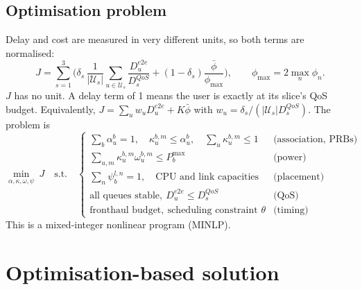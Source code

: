 \documentclass[11pt,oneside]{report}
\newcommand{\cU}{\mathcal{U}}
\begin{document}
\subsection{Optimisation problem}
Delay and cost are measured in very different units, so both terms are normalised:
\begin{equation}\label{eq:J}
	J=\sum_{s=1}^{3}\Big(\delta_s\,\frac{1}{|\cU_s|}\sum_{u\in\cU_s}\frac{D_u^{e2e}}{D_s^{QoS}}+(1-\delta_s)\frac{\bar\phi}{\phi_{\max}}\Big),\qquad \phi_{\max}=2\max_n\phi_n .
\end{equation}
$J$ has no unit. A delay term of 1 means the user is exactly at its slice's QoS budget.
Equivalently, $J=\sum_u w_uD_u^{e2e}+K\bar\phi$ with $w_u=\delta_s/(|\cU_s|D_s^{QoS})$.
The problem is
\begin{equation}\label{eq:problem}
	\min_{\alpha,\kappa,\omega,\psi}\ J
	\quad\text{s.t.}\quad
	\begin{cases}
		\sum_b\alpha_u^b=1, \quad \kappa_u^{b,m}\le\alpha_u^b, \quad \sum_u\kappa_u^{b,m}\le1 & \text{(association, PRBs)}\\
		\sum_{u,m}\kappa_u^{b,m}\omega_u^{b,m}\le P_b^{\max} & \text{(power)}\\
		\sum_n\psi_b^{l,n}=1,\quad \text{CPU and link capacities} & \text{(placement)}\\
		\text{all queues stable},\ D_u^{e2e}\le D_s^{QoS} & \text{(QoS)}\\
		\text{fronthaul budget},\ \text{scheduling constraint } \theta & \text{(timing)}
	\end{cases}
\end{equation}
This is a mixed-integer nonlinear program (MINLP).

\section{Optimisation-based solution}\label{sec:opt}
\end{document}
